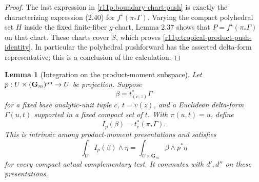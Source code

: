 \documentclass[11pt]{article}
\newtheorem{lemma}[theorem]{Lemma}
\theoremstyle{definition}
\theoremstyle{remark}
\numberwithin{equation}{section}
\begin{document}
\begin{proof}
The last expression in \eqref{r11p:boundary-chart-push} is exactly
the characterizing expression (2.40) for
$f^\star(\pi_*\Gamma)$.  Varying the compact polyhedral set $H$
inside the fixed finite-fiber $g$-chart, Lemma 2.37 shows that
$P=f^\star(\pi_*\Gamma)$ on that chart.  These charts cover $S$,
which proves \eqref{r11p:tropical-product-push-identity}.
In particular the polyhedral pushforward has the asserted
delta-form representative; this is a conclusion of the calculation.
\end{proof}

\begin{lemma}[Integration on the product-moment subspace]
\label{r11p:product-integration}
Let $p:U\times(\mathbf G_m)^{\rm an}\to U$ be projection.  Suppose
\[
                   \beta=t_{(c,z)}^*\Gamma
\]
for a fixed base analytic-unit tuple $c$, $t=v(z)$, and a Euclidean
delta-form $\Gamma(u,t)$ supported in a fixed compact set of $t$.
With $\pi(u,t)=u$, define
\[
                       I_p(\beta)=t_c^*(\pi_*\Gamma).
\tag{MT6}\label{r11p:product-definition}
\]
This is intrinsic among product-moment presentations and satisfies
\[
             \int_UI_p(\beta)\wedge\eta
                    =\int_{U\times\mathbf G_m}\beta\wedge p^*\eta
\tag{MT7}\label{r11p:product-pairing}
\]
for every compact actual complementary test.  It commutes with
$d',d''$ on these presentations.
\end{lemma}
\end{document}
